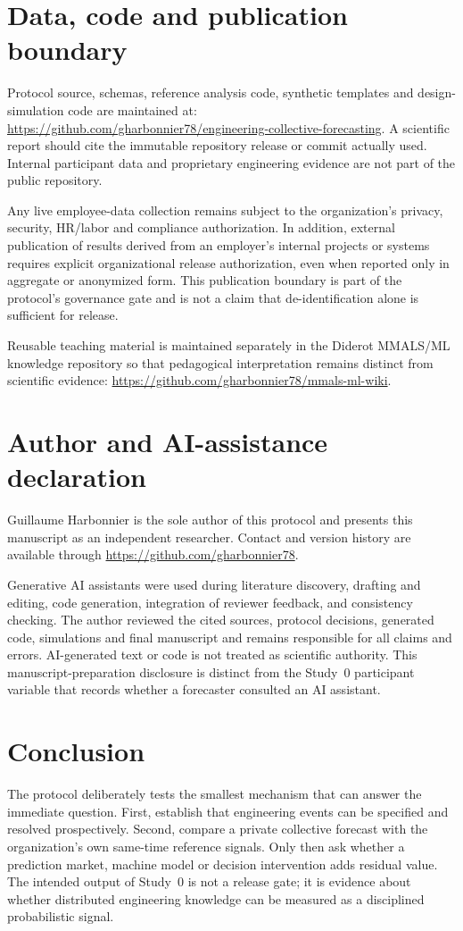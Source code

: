 \section{Data, code and publication boundary}
Protocol source, schemas, reference analysis code, synthetic templates and design-simulation code are maintained at:
\url{https://github.com/gharbonnier78/engineering-collective-forecasting}.
A scientific report should cite the immutable repository release or commit actually used. Internal participant data and proprietary engineering evidence are not part of the public repository.

Any live employee-data collection remains subject to the organization's privacy, security, HR/labor and compliance authorization. In addition, external publication of results derived from an employer's internal projects or systems requires explicit organizational release authorization, even when reported only in aggregate or anonymized form. This publication boundary is part of the protocol's governance gate and is not a claim that de-identification alone is sufficient for release.

Reusable teaching material is maintained separately in the Diderot MMALS/ML knowledge repository so that pedagogical interpretation remains distinct from scientific evidence:
\url{https://github.com/gharbonnier78/mmals-ml-wiki}.

\section{Author and AI-assistance declaration}
Guillaume Harbonnier is the sole author of this protocol and presents this manuscript as an independent researcher. Contact and version history are available through
\url{https://github.com/gharbonnier78}.

Generative AI assistants were used during literature discovery, drafting and editing, code generation, integration of reviewer feedback, and consistency checking. The author reviewed the cited sources, protocol decisions, generated code, simulations and final manuscript and remains responsible for all claims and errors. AI-generated text or code is not treated as scientific authority. This manuscript-preparation disclosure is distinct from the Study~0 participant variable that records whether a forecaster consulted an AI assistant.

\section{Conclusion}
The protocol deliberately tests the smallest mechanism that can answer the immediate question. First, establish that engineering events can be specified and resolved prospectively. Second, compare a private collective forecast with the organization's own same-time reference signals. Only then ask whether a prediction market, machine model or decision intervention adds residual value. The intended output of Study~0 is not a release gate; it is evidence about whether distributed engineering knowledge can be measured as a disciplined probabilistic signal.
